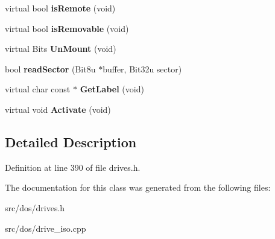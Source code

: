 \begin{DoxyCompactItemize}
\item 
\hypertarget{classisoDrive_a3bf3c53009a3bd8ca3fe822d9ff2487d}{virtual bool {\bfseries is\-Remote} (void)}\label{classisoDrive_a3bf3c53009a3bd8ca3fe822d9ff2487d}

\item 
\hypertarget{classisoDrive_ab3a5c7695c171b7132ee2b8d08ebcd64}{virtual bool {\bfseries is\-Removable} (void)}\label{classisoDrive_ab3a5c7695c171b7132ee2b8d08ebcd64}

\item 
\hypertarget{classisoDrive_ad58ab0d475eec136f5738b4ac8d33136}{virtual Bits {\bfseries Un\-Mount} (void)}\label{classisoDrive_ad58ab0d475eec136f5738b4ac8d33136}

\item 
\hypertarget{classisoDrive_a4e6ef7d78f8bc93437a216f1b88b3d43}{bool {\bfseries read\-Sector} (Bit8u $\ast$buffer, Bit32u sector)}\label{classisoDrive_a4e6ef7d78f8bc93437a216f1b88b3d43}

\item 
\hypertarget{classisoDrive_acf1acbf5887b1d557589ea6eb1301a07}{virtual char const $\ast$ {\bfseries Get\-Label} (void)}\label{classisoDrive_acf1acbf5887b1d557589ea6eb1301a07}

\item 
\hypertarget{classisoDrive_a13b831240141955fb769a1d7b3dca700}{virtual void {\bfseries Activate} (void)}\label{classisoDrive_a13b831240141955fb769a1d7b3dca700}

\end{DoxyCompactItemize}


\subsection{Detailed Description}


Definition at line 390 of file drives.\-h.



The documentation for this class was generated from the following files\-:\begin{DoxyCompactItemize}
\item 
src/dos/drives.\-h\item 
src/dos/drive\-\_\-iso.\-cpp\end{DoxyCompactItemize}
